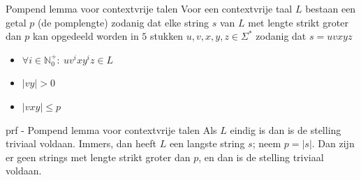 \vspace{0.5cm}

\begin{lem}{Pompend lemma voor contextvrije talen}
    \vspace{-0.1cm}
    Voor een contextvrije taal $L$ bestaan een getal $p$ (de pomplengte) zodanig dat elke string $s$ van $L$ met lengte
    strikt groter dan $p$ kan opgedeeld worden in $5$ stukken $u,v,x,y,z \in \Sigma^*$ zodanig dat $s = uvxyz$
    \begin{itemize}
        \item $\forall i \in \mathbb{N}_0^+: \ uv^ixy^iz \in L$
        \item $|vy| > 0$
        \item $|vxy| \leq p$
    \end{itemize}
    \vspace{-0.3cm}
\end{lem}

\begin{prf}{prf - Pompend lemma voor contextvrije talen}
    \vspace{-0.1cm}
    Als $L$ eindig is dan is de stelling triviaal voldaan. Immers, dan heeft $L$ een langste string $s$; 
    neem $p = |s|$. Dan zijn er geen strings met lengte strikt groter dan $p$, en
    dan is de stelling triviaal voldaan. \\ \vspace{-0.2cm} 
\end{prf}

